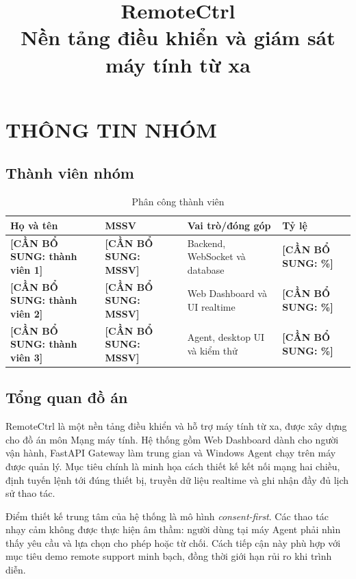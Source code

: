\documentclass[12pt,a4paper]{article}
\title{RemoteCtrl\\\large Nền tảng điều khiển và giám sát máy tính từ xa}
\author{\placeholder{tên nhóm và thành viên}}
\date{\placeholder{ngày nộp}}
\newcommand{\placeholder}[1]{\textbf{[CẦN BỔ SUNG: #1]}}
\begin{document}
\maketitle
\tableofcontents
\newpage

\section{THÔNG TIN NHÓM}

\subsection{Thành viên nhóm}

\begin{table}[H]
\centering
\caption{Phân công thành viên}
\begin{tabularx}{\textwidth}{|p{}|p{}|Y|p{0.16\textwidth}|}
\hline
\textbf{Họ và tên} & \textbf{MSSV} & \textbf{Vai trò/đóng góp} & \textbf{Tỷ lệ}\\
\hline
\placeholder{thành viên 1} & \placeholder{MSSV} & Backend, WebSocket và database & \placeholder{\%}\\
\hline
\placeholder{thành viên 2} & \placeholder{MSSV} & Web Dashboard và UI realtime & \placeholder{\%}\\
\hline
\placeholder{thành viên 3} & \placeholder{MSSV} & Agent, desktop UI và kiểm thử & \placeholder{\%}\\
\hline
\end{tabularx}
\end{table}

\subsection{Tổng quan đồ án}

RemoteCtrl là một nền tảng điều khiển và hỗ trợ máy tính từ xa, được xây dựng cho đồ án môn Mạng máy tính. Hệ thống gồm Web Dashboard dành cho người vận hành, FastAPI Gateway làm trung gian và Windows Agent chạy trên máy được quản lý. Mục tiêu chính là minh họa cách thiết kế kết nối mạng hai chiều, định tuyến lệnh tới đúng thiết bị, truyền dữ liệu realtime và ghi nhận đầy đủ lịch sử thao tác.

Điểm thiết kế trung tâm của hệ thống là mô hình \textit{consent-first}. Các thao tác nhạy cảm không được thực hiện âm thầm: người dùng tại máy Agent phải nhìn thấy yêu cầu và lựa chọn cho phép hoặc từ chối. Cách tiếp cận này phù hợp với mục tiêu demo remote support minh bạch, đồng thời giới hạn rủi ro khi trình diễn.
\end{document}
